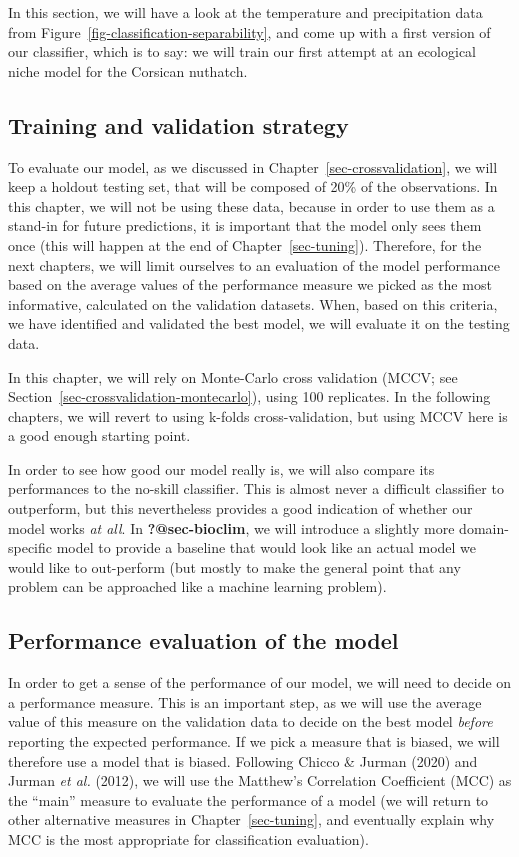 \documentclass[
  letterpaper,
]{scrbook}
\begin{document}
In this section, we will have a look at the temperature and
precipitation data from Figure~\ref{fig-classification-separability},
and come up with a first version of our classifier, which is to say: we
will train our first attempt at an ecological niche model for the
Corsican nuthatch.

\subsection{Training and validation
strategy}\label{training-and-validation-strategy}

To evaluate our model, as we discussed in
Chapter~\ref{sec-crossvalidation}, we will keep a holdout testing set,
that will be composed of 20\% of the observations. In this chapter, we
will not be using these data, because in order to use them as a stand-in
for future predictions, it is important that the model only sees them
once (this will happen at the end of Chapter~\ref{sec-tuning}).
Therefore, for the next chapters, we will limit ourselves to an
evaluation of the model performance based on the average values of the
performance measure we picked as the most informative, calculated on the
validation datasets. When, based on this criteria, we have identified
and validated the best model, we will evaluate it on the testing data.

In this chapter, we will rely on Monte-Carlo cross validation (MCCV; see
Section~\ref{sec-crossvalidation-montecarlo}), using 100 replicates. In
the following chapters, we will revert to using k-folds
cross-validation, but using MCCV here is a good enough starting point.

In order to see how good our model really is, we will also compare its
performances to the no-skill classifier. This is almost never a
difficult classifier to outperform, but this nevertheless provides a
good indication of whether our model works \emph{at all}. In
\textbf{?@sec-bioclim}, we will introduce a slightly more
domain-specific model to provide a baseline that would look like an
actual model we would like to out-perform (but mostly to make the
general point that any problem can be approached like a machine learning
problem).

\subsection{Performance evaluation of the
model}\label{performance-evaluation-of-the-model}

In order to get a sense of the performance of our model, we will need to
decide on a performance measure. This is an important step, as we will
use the average value of this measure on the validation data to decide
on the best model \emph{before} reporting the expected performance. If
we pick a measure that is biased, we will therefore use a model that is
biased. Following Chicco \& Jurman (2020) and Jurman \emph{et al.}
(2012), we will use the Matthew's Correlation Coefficient (MCC) as the
``main'' measure to evaluate the performance of a model (we will return
to other alternative measures in Chapter~\ref{sec-tuning}, and
eventually explain why MCC is the most appropriate for classification
evaluation).
\end{document}
